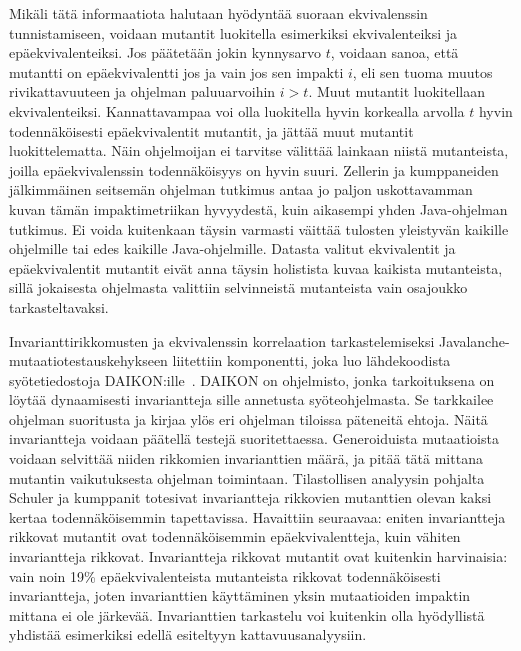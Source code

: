 \documentclass[finnish]{tktltiki2}
\begin{document}
Mikäli tätä informaatiota halutaan hyödyntää suoraan ekvivalenssin tunnistamiseen, voidaan mutantit luokitella esimerkiksi ekvivalenteiksi ja epäekvivalenteiksi. Jos päätetään jokin kynnysarvo $t$, voidaan sanoa, että mutantti on epäekvivalentti jos ja vain jos sen impakti $i$, eli sen tuoma muutos rivikattavuuteen ja ohjelman paluuarvoihin $i > t$. Muut mutantit luokitellaan ekvivalenteiksi. Kannattavampaa voi olla luokitella hyvin korkealla arvolla $t$ hyvin todennäköisesti epäekvivalentit mutantit, ja jättää muut mutantit luokittelematta. Näin ohjelmoijan ei tarvitse välittää lainkaan niistä mutanteista, joilla epäekvivalenssin todennäköisyys on hyvin suuri. Zellerin ja kumppaneiden jälkimmäinen seitsemän ohjelman tutkimus antaa jo paljon uskottavamman kuvan tämän impaktimetriikan hyvyydestä, kuin aikasempi yhden Java-ohjelman tutkimus. Ei voida kuitenkaan täysin varmasti väittää tulosten yleistyvän kaikille ohjelmille tai edes kaikille Java-ohjelmille. Datasta valitut ekvivalentit ja epäekvivalentit mutantit eivät anna täysin holistista kuvaa kaikista mutanteista, sillä jokaisesta ohjelmasta valittiin selvinneistä mutanteista vain osajoukko tarkasteltavaksi.

Invarianttirikkomusten ja ekvivalenssin korrelaation tarkastelemiseksi Javalanche-mutaatiotestauskehykseen liitettiin komponentti, joka luo lähdekoodista syötetiedostoja DAIKON:ille~\cite{ErnstPGMPTX2007}. DAIKON on ohjelmisto, jonka tarkoituksena on löytää dynaamisesti invariantteja sille annetusta syöteohjelmasta. Se tarkkailee ohjelman suoritusta ja kirjaa ylös eri ohjelman tiloissa päteneitä ehtoja. Näitä invariantteja voidaan päätellä testejä suoritettaessa. Generoiduista mutaatioista voidaan selvittää niiden rikkomien invarianttien määrä, ja pitää tätä mittana mutantin vaikutuksesta ohjelman toimintaan. Tilastollisen analyysin pohjalta Schuler ja kumppanit totesivat invariantteja rikkovien mutanttien olevan kaksi kertaa todennäköisemmin tapettavissa. Havaittiin seuraavaa: eniten invariantteja rikkovat mutantit ovat todennäköisemmin epäekvivalentteja, kuin vähiten invariantteja rikkovat. Invariantteja rikkovat mutantit ovat kuitenkin harvinaisia: vain noin 19\% epäekvivalenteista mutanteista rikkovat todennäköisesti invariantteja, joten invarianttien käyttäminen yksin mutaatioiden impaktin mittana ei ole järkevää. Invarianttien tarkastelu voi kuitenkin olla hyödyllistä yhdistää esimerkiksi edellä esiteltyyn kattavuusanalyysiin.
\end{document}
